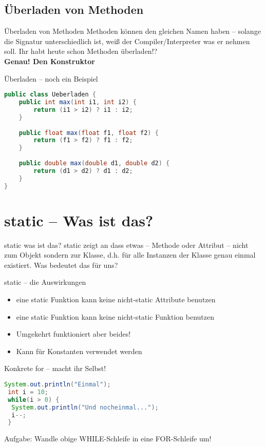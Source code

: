 \documentclass[18pt]{beamer}
\begin{document}
\subsection{Überladen von Methoden}
\begin{frame}{Überladen von Methoden}
 Methoden können den gleichen Namen haben – solange die Signatur unterschiedlich ist, weiß der Compiler/Interpreter was er nehmen soll.
 Ihr habt heute schon Methoden überladen!? \\ \pause
 \textbf{Genau! Den Konstruktor}
\end{frame}

\begin{frame}[fragile]{Überladen – noch ein Beispiel}
 \begin{lstlisting}[language=java]
public class Ueberladen {
    public int max(int i1, int i2) { 
        return (i1 > i2) ? i1 : i2; 
    }
   
    public float max(float f1, float f2) { 
        return (f1 > f2) ? f1 : f2; 
    }
    
    public double max(double d1, double d2) { 
        return (d1 > d2) ? d1 : d2; 
    }
} 
 \end{lstlisting}
\end{frame}

\section{static – Was ist das?}
\begin{frame}{static was ist das?}
 static zeigt an dass etwas – Methode oder Attribut – nicht zum Objekt sondern zur Klasse, d.h. für alle Instanzen der Klasse genau einmal existiert.
 Was bedeutet das für uns?
\end{frame}

\begin{frame}{static – die Auswirkungen}
\begin{itemize}
 \item eine static Funktion kann keine nicht-static Attribute benutzen
 \item eine static Funktion kann keine nicht-static Funktion benutzen
 \item Umgekehrt funktioniert aber beides!
 \item Kann für Konstanten verwendet werden
\end{itemize}
 

\end{frame}


\begin{frame}[fragile]{Konkrete for – macht ihr Selbst!}
 \begin{lstlisting}[language=java]
 System.out.println("Einmal");
 int i = 10;
 while(i > 0) {
  System.out.println("Und nocheinmal...");
  i--;
 }
 \end{lstlisting}
 Aufgabe: Wandle obige WHILE-Schleife in eine FOR-Schleife um!
\end{frame}
\end{document}
